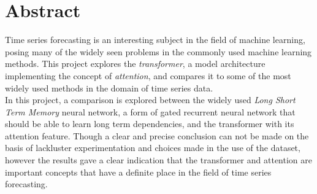\documentclass[main.tex]{subfiles}
\begin{document}
\section{Abstract}
Time series forecasting is an interesting subject in the field of machine learning, posing many of the widely seen problems in the commonly used machine learning methods. This project explores the \textit{transformer}, a model architecture implementing the concept of \textit{attention}, and compares it to some of the most widely used methods in the domain of time series data.\\
In this project, a comparison is explored between the widely used \textit{Long Short Term Memory} neural network, a form of gated recurrent neural network that should be able to learn long term dependencies, and the transformer with its attention feature. Though a clear and precise conclusion can not be made on the basis of lackluster experimentation and choices made in the use of the dataset, however the results gave a clear indication that the transformer and attention are important concepts that have a definite place in the field of time series forecasting.
\end{document}
